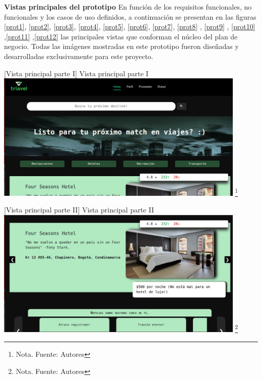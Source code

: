 \begin{itemize}
\textbf{Vistas principales del prototipo}
En función de los requisitos funcionales, no funcionales y los casos de uso definidos, a continuación se presentan en las figuras \ref{prot1}, \ref{prot2}, \ref{prot3}, \ref{prot4}, \ref{prot5}, \ref{prot6}, \ref{prot7}, \ref{prot8} , \ref{prot9} , \ref{prot10} ,\ref{prot11} ,\ref{prot12} las principales vistas que conforman el núcleo del plan de negocio. Todas las imágenes mostradas en este prototipo fueron diseñadas y desarrolladas exclusivamente para este proyecto.

    \vspace{2mm}
    \begin{minipage}{0.9\textwidth}
    \centering
    [{Vista principal parte I}]{ Vista principal parte I}
    \label{prot1}
    \includegraphics[width=0.9\textwidth]{Content/Images/VistaGeneral1.png}
    \footnote{Nota. \textup{Fuente: Autores}}
    \end{minipage}

    \vspace{2mm}
    \begin{minipage}{0.9\textwidth}
    \centering
    [{Vista principal parte II}]{ Vista principal parte II}
    \label{prot2}
    \includegraphics[width=0.9\textwidth]{Content/Images/VistaGeneral2.png}
    \footnote{Nota. \textup{Fuente: Autores}}
    \end{minipage}


\end{itemize}
